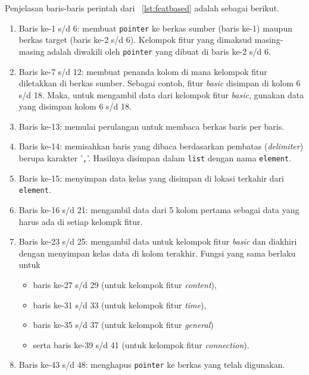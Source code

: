 Penjelasan baris-baris perintah dari \lstlistingname~\ref{lst:featbased} adalah sebagai berikut.
\begin{enumerate}
  \item Baris ke-1 s/d 6: membuat \texttt{pointer} ke berkas sumber (baris ke-1) maupun berkas target (baris ke-2 s/d 6). Kelompok fitur yang dimaksud masing-masing adalah diwakili oleh \texttt{pointer} yang dibuat di baris ke-2 s/d 6.
  \item Baris ke-7 s/d 12: membuat penanda kolom di mana kelompok fitur diletakkan di berkas sumber. Sebagai contoh, fitur \textit{basic} disimpan di kolom 6 s/d 18. Maka, untuk mengambil data dari kelompok fitur \textit{basic}, gunakan data yang disimpan kolom 6 s/d 18.
  \item Baris ke-13: memulai perulangan untuk membaca berkas baris per baris.
  \item Baris ke-14: memisahkan baris yang dibaca berdasarkan pembatas (\textit{delimiter}) berupa karakter '\texttt{,}'. Hasilnya disimpan dalam \texttt{list} dengan nama \texttt{element}.
  \item Baris ke-15: menyimpan data kelas yang disimpan di lokasi terkahir dari \texttt{element}.
  \item Baris ke-16 s/d 21: mengambil data dari 5 kolom pertama sebagai data yang harus ada di setiap kelompk fitur.
  \item Baris ke-23 s/d 25: mengambil data untuk kelompok fitur \textit{basic} dan diakhiri dengan menyimpan kelas data di kolom terakhir. Fungsi yang sama berlaku untuk
  \begin{itemize}
     \item baris ke-27 s/d 29 (untuk kelompok fitur \textit{content}),
     \item baris ke-31 s/d 33 (untuk kelompok fitur \textit{time}),
     \item baris ke-35 s/d 37 (untuk kelompok fitur \textit{general})
     \item serta baris ke-39 s/d 41 (untuk kelompok fitur \textit{connection}).
   \end{itemize}
   \item Baris ke-43 s/d 48: menghapus \texttt{pointer} ke berkas yang telah digunakan.
\end{enumerate} 

